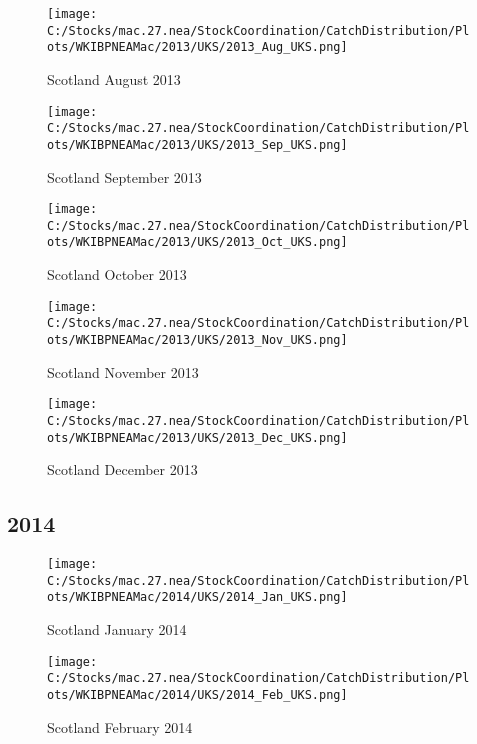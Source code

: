 \documentclass{article}
\begin{document}
\begin{figure}
	\centering
		\texttt{[image: C:/Stocks/mac.27.nea/StockCoordination/CatchDistribution/Plots/WKIBPNEAMac/2013/UKS/2013\_Aug\_UKS.png]}
	\caption{Scotland August 2013}
	\label{fig:2013_Aug_UKS}
\end{figure}

\begin{figure}
	\centering
		\texttt{[image: C:/Stocks/mac.27.nea/StockCoordination/CatchDistribution/Plots/WKIBPNEAMac/2013/UKS/2013\_Sep\_UKS.png]}
	\caption{Scotland September 2013}
	\label{fig:2013_Sep_UKS}
\end{figure}

\begin{figure}
	\centering
		\texttt{[image: C:/Stocks/mac.27.nea/StockCoordination/CatchDistribution/Plots/WKIBPNEAMac/2013/UKS/2013\_Oct\_UKS.png]}
	\caption{Scotland October 2013}
	\label{fig:2013_Oct_UKS}
\end{figure}

\begin{figure}
	\centering
		\texttt{[image: C:/Stocks/mac.27.nea/StockCoordination/CatchDistribution/Plots/WKIBPNEAMac/2013/UKS/2013\_Nov\_UKS.png]}
	\caption{Scotland November 2013}
	\label{fig:2013_Nov_UKS}
\end{figure}

\begin{figure}
	\centering
		\texttt{[image: C:/Stocks/mac.27.nea/StockCoordination/CatchDistribution/Plots/WKIBPNEAMac/2013/UKS/2013\_Dec\_UKS.png]}
	\caption{Scotland December 2013}
	\label{fig:2013_Dec_UKS}
\end{figure}

\clearpage

\newpage

\subsection{2014}



\begin{figure}[h]
	\centering
		\texttt{[image: C:/Stocks/mac.27.nea/StockCoordination/CatchDistribution/Plots/WKIBPNEAMac/2014/UKS/2014\_Jan\_UKS.png]}
	\caption{Scotland January 2014}
	\label{fig:2014_Jan_UKS}
\end{figure}

\begin{figure}
	\centering
		\texttt{[image: C:/Stocks/mac.27.nea/StockCoordination/CatchDistribution/Plots/WKIBPNEAMac/2014/UKS/2014\_Feb\_UKS.png]}
	\caption{Scotland February 2014}
	\label{fig:2014_Feb_UKS}
\end{figure}
\end{document}
